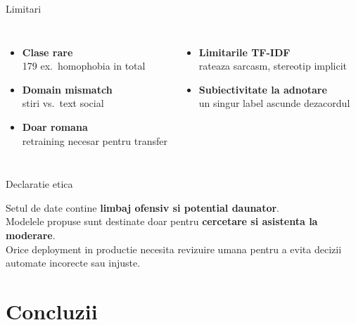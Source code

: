 \documentclass[10pt,aspectratio=169]{beamer}
\newcommand{\sub}[1]{{\small\textcolor{ubdark!70}{#1}}}
\begin{document}
\begin{frame}{Limitari}
\begin{columns}[T,onlytextwidth]
\begin{itemize}
  \item \textbf{Clase rare} \\ \sub{179 ex.\ homophobia in total}
  \item \textbf{Domain mismatch} \\ \sub{stiri vs.\ text social}
  \item \textbf{Doar romana} \\ \sub{retraining necesar pentru transfer}
\end{itemize}
\begin{itemize}
  \item \textbf{Limitarile TF-IDF} \\ \sub{rateaza sarcasm, stereotip implicit}
  \item \textbf{Subiectivitate la adnotare} \\ \sub{un singur label ascunde dezacordul}
\end{itemize}
\end{columns}
\end{frame}

\begin{frame}{Declaratie etica}
\begin{block}{}
Setul de date contine \textbf{limbaj ofensiv si potential daunator}.\\[0.4em]
Modelele propuse sunt destinate doar pentru \textbf{cercetare si asistenta la moderare}.\\[0.4em]
Orice deployment in productie necesita \alert{revizuire umana} pentru a evita decizii automate incorecte sau injuste.
\end{block}
\end{frame}

\section{Concluzii}
\end{document}
